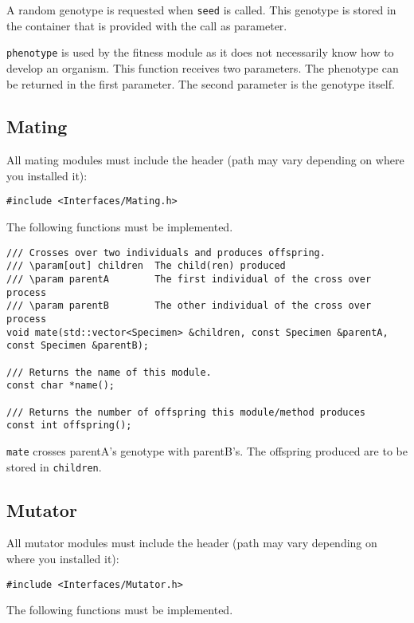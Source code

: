 \noindent A random genotype is requested when \texttt{seed} is called. This genotype is stored in the container that is provided with the call as parameter.

\texttt{phenotype} is used by the fitness module as it does not necessarily know how to develop an organism. This function receives two parameters. The phenotype can be returned in the first parameter. The second parameter is the genotype itself.


\subsection{Mating}

All mating modules must include the header (path may vary depending on where you installed it):

\begin{verbatim}
#include <Interfaces/Mating.h>
\end{verbatim}

\noindent The following functions must be implemented.

\begin{verbatim}
/// Crosses over two individuals and produces offspring.
/// \param[out] children  The child(ren) produced
/// \param parentA        The first individual of the cross over process
/// \param parentB        The other individual of the cross over process
void mate(std::vector<Specimen> &children, const Specimen &parentA, const Specimen &parentB);

/// Returns the name of this module.
const char *name();

/// Returns the number of offspring this module/method produces
const int offspring();
\end{verbatim}

\noindent\texttt{mate} crosses parentA's genotype with parentB's. The offspring produced are to be stored in \texttt{children}.


\subsection{Mutator}

All mutator modules must include the header (path may vary depending on where you installed it):

\begin{verbatim}
#include <Interfaces/Mutator.h>
\end{verbatim}

\noindent The following functions must be implemented.

